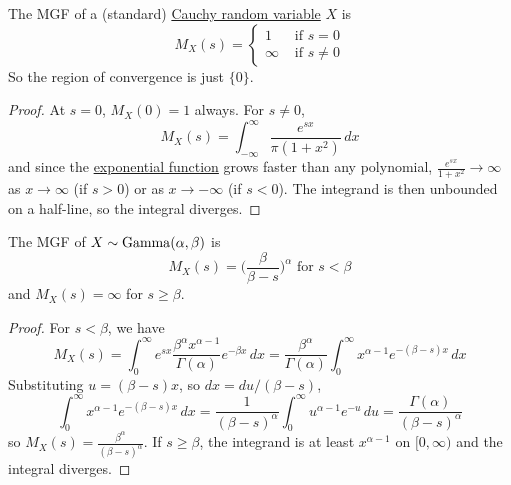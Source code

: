 	\begin{theorem}
	  \label{thm:mgf-of-cauchy-distribution}
		The MGF of a (standard) \hyperref[def:cauchy-random-variable-standardized]{Cauchy random variable} $X$ is 
		\begin{equation}
			M_X (s) = \begin{cases} 1 & \text{ if } s = 0 \\
			\infty & \text{ if } s \neq 0 \end{cases}
		\end{equation}
		So the region of convergence is just $\{0\}$. 
	\end{theorem}
	\begin{proof}
		At $s = 0$, $M_X (0) = 1$ always. For $s \neq 0$, 
		\begin{equation}
			M_X (s) = \int_{-\infty}^\infty \frac{e^{s x}}{\pi (1 + x^2)} \,dx
		\end{equation}
		and since the \hyperref[real-def:exponential-function]{exponential function} grows faster than any polynomial, $\frac{e^{s x}}{1 + x^2} \to \infty$ as $x \to \infty$ (if $s > 0$) or as $x \to -\infty$ (if $s < 0$). The integrand is then unbounded on a half-line, so the integral diverges. 
	\end{proof}

	\begin{theorem}
	  \label{thm:mgf-of-gamma-distribution}
		The MGF of \hyperref[def:gamma-random-variable]{$X \sim \operatorname{Gamma}(\alpha, \beta)$} is 
		\begin{equation}
			M_X (s) = \bigg( \frac{\beta}{\beta - s} \bigg)^\alpha \text{ for } s < \beta
		\end{equation}
		and $M_X (s) = \infty$ for $s \geq \beta$. 
	\end{theorem}
	\begin{proof}
		For $s < \beta$, we have 
		\begin{equation}
			M_X (s) = \int_0^\infty e^{s x} \frac{\beta^\alpha x^{\alpha-1}}{\Gamma(\alpha)} e^{-\beta x} \,dx = \frac{\beta^\alpha}{\Gamma(\alpha)} \int_0^\infty x^{\alpha - 1} e^{-(\beta - s) x} \,dx
		\end{equation}
		Substituting $u = (\beta - s) x$, so $dx = du / (\beta - s)$, 
		\begin{equation}
			\int_0^\infty x^{\alpha - 1} e^{-(\beta - s) x} \,dx = \frac{1}{(\beta - s)^\alpha} \int_0^\infty u^{\alpha - 1} e^{-u} \,du = \frac{\Gamma(\alpha)}{(\beta - s)^\alpha}
		\end{equation}
		so $M_X (s) = \frac{\beta^\alpha}{(\beta - s)^\alpha}$. If $s \geq \beta$, the integrand is at least $x^{\alpha - 1}$ on $[0, \infty)$ and the integral diverges. 
	\end{proof}

